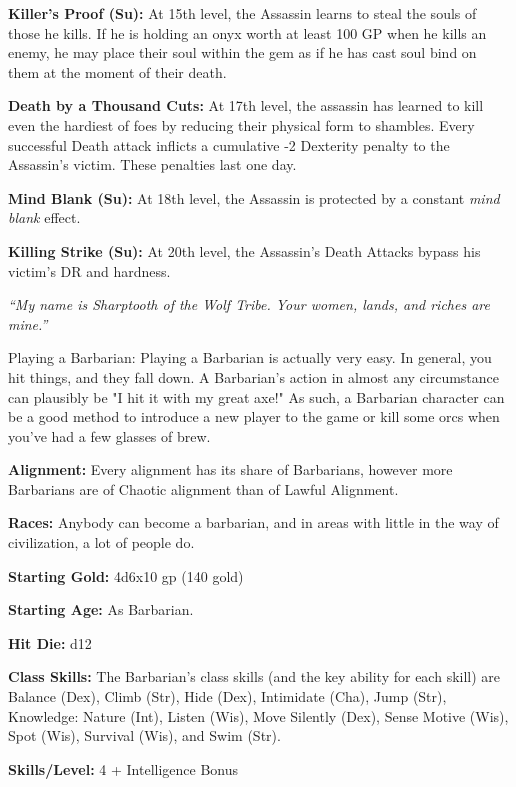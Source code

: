 \documentclass[10pt]{article}
\newcommand{\ability}[2]{\smallskip \noindent \textbf{#1} #2}
\newcommand{\classname}[1]{\noindent{\huge \textbf{#1}}}
\newcommand{\quot}[1]{\emph{#1}\medskip}
\newcommand{\desc}[1]{#1 \medskip}
\newcommand{\spell}[1]{\emph{#1}}
\begin{document}
\ability{Killer's Proof (Su):}{At 15th level, the Assassin learns to steal the souls of those he kills. If he is holding an onyx worth at least 100 GP when he kills an enemy, he may place their soul within the gem as if he has cast soul bind on them at the moment of their death.}

\ability{Death by a Thousand Cuts:}{At 17th level, the assassin has learned to kill even the hardiest of foes by reducing their physical form to shambles. Every successful Death attack inflicts a cumulative -2 Dexterity penalty to the Assassin's victim. These penalties last one day.}

\ability{Mind Blank (Su):}{At 18th level, the Assassin is protected by a constant \spell{mind blank} effect.}

\ability{Killing Strike (Su):}{At 20th level, the Assassin's Death Attacks bypass his victim's DR and hardness.}

\newpage


\classname{Barbarian}

\quot{``My name is Sharptooth of the Wolf Tribe. Your women, lands, and riches are mine.''}

\desc{Playing a Barbarian: Playing a Barbarian is actually very easy. In general, you hit things, and they fall down. A Barbarian's action in almost any circumstance can plausibly be "I hit it with my great axe!" As such, a Barbarian character can be a good method to introduce a new player to the game or kill some orcs when you've had a few glasses of brew.}

\ability{Alignment:}{Every alignment has its share of Barbarians, however more Barbarians are of Chaotic alignment than of Lawful Alignment.}

\ability{Races:}{Anybody can become a barbarian, and in areas with little in the way of civilization, a lot of people do.}

\ability{Starting Gold:}{4d6x10 gp (140 gold)}

\ability{Starting Age:}{As Barbarian.}

\ability{Hit Die:}{d12}

\ability{Class Skills:}{The Barbarian's class skills (and the key ability for each skill) are Balance (Dex), Climb (Str), Hide (Dex), Intimidate (Cha), Jump (Str), Knowledge: Nature (Int), Listen (Wis), Move Silently (Dex), Sense Motive (Wis), Spot (Wis), Survival (Wis), and Swim (Str).}

\ability{Skills/Level:}{4 + Intelligence Bonus}
\end{document}
